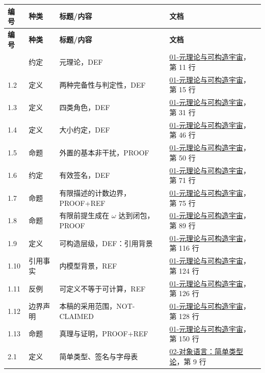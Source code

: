 \documentclass[UTF8,a4paper,zihao=-4,fontset=windows,openany]{ctexbook}
\begin{document}
\begingroup\small\setlength{\tabcolsep}{4pt}
\begin{longtable}{l>{\raggedright\arraybackslash}p{}>{\raggedright\arraybackslash}p{}>{\raggedright\arraybackslash}p{}}
\toprule
\textbf{编号} & \textbf{种类} & \textbf{标题/内容} & \textbf{文档} \\
\midrule
\endfirsthead
\toprule
\textbf{编号} & \textbf{种类} & \textbf{标题/内容} & \textbf{文档} \\
\midrule
\endhead
\bottomrule
\endfoot
\bottomrule
\endlastfoot
1.1 & 约定 & 元理论，DEF & \hyperref[mcs-source-3]{01-元理论与可构造宇宙}，第 11 行 \\
1.2 & 定义 & 两种完备性与判定性，DEF & \hyperref[mcs-source-3]{01-元理论与可构造宇宙}，第 15 行 \\
1.3 & 定义 & 四类角色，DEF & \hyperref[mcs-source-3]{01-元理论与可构造宇宙}，第 31 行 \\
1.4 & 定义 & 大小约定，DEF & \hyperref[mcs-source-3]{01-元理论与可构造宇宙}，第 46 行 \\
1.5 & 命题 & 外置的基本非干扰，PROOF & \hyperref[mcs-source-3]{01-元理论与可构造宇宙}，第 50 行 \\
1.6 & 约定 & 有效签名，DEF & \hyperref[mcs-source-3]{01-元理论与可构造宇宙}，第 71 行 \\
1.7 & 命题 & 有限描述的计数边界，PROOF+REF & \hyperref[mcs-source-3]{01-元理论与可构造宇宙}，第 75 行 \\
1.8 & 命题 & 有限前提生成在 \(\omega\) 达到闭包，PROOF & \hyperref[mcs-source-3]{01-元理论与可构造宇宙}，第 89 行 \\
1.9 & 定义 & 可构造层级，DEF：引用背景 & \hyperref[mcs-source-3]{01-元理论与可构造宇宙}，第 116 行 \\
1.10 & 引用事实 & 内模型背景，REF & \hyperref[mcs-source-3]{01-元理论与可构造宇宙}，第 124 行 \\
1.11 & 反例 & 可定义不等于可计算，REF & \hyperref[mcs-source-3]{01-元理论与可构造宇宙}，第 126 行 \\
1.12 & 边界声明 & 本稿的采用范围，NOT-CLAIMED & \hyperref[mcs-source-3]{01-元理论与可构造宇宙}，第 128 行 \\
1.13 & 命题 & 真理与证明，PROOF+REF & \hyperref[mcs-source-3]{01-元理论与可构造宇宙}，第 150 行 \\
2.1 & 定义 & 简单类型、签名与字母表 & \hyperref[mcs-source-4]{02-对象语言：简单类型论}，第 9 行 \\

\end{longtable}
\end{document}
